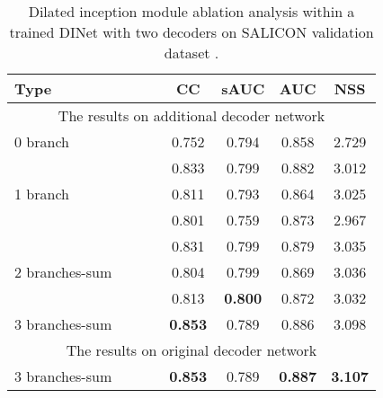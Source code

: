 \begin{table}[]
	\centering
	\scriptsize
	\caption{
Dilated inception module ablation analysis within a trained DINet with two decoders on SALICON validation dataset \cite{jiang2015salicon}.
	}
	\label{table:dimaa1}
	\begin{tabular}{|l|ccc|cccc|}
		\hline
		Type                          & &  & & CC    & sAUC  & AUC   & NSS   \\ \hline \hline
		\multicolumn{8}{|c|}{The results on additional decoder network}               \\ \hline
		0 branch                 &    &    &    &  0.752  & 0.794 & 0.858 & 2.729 \\ \hline
		\multirow{3}{*}{1 branch}     & \checkmark  &    &    & 0.833 & 0.799 & 0.882 & 3.012 \\ \cline{2-8} 
		&    & \checkmark  &    & 0.811  & 0.793 & 0.864 & 3.025 \\ \cline{2-8} 
		&    &    & \checkmark  & 0.801 & 0.759  & 0.873 & 2.967  \\ \hline
		\multirow{3}{*}{2 branches-sum} & \checkmark  & \checkmark  &    & 0.831 & 0.799 & 0.879  & 3.035 \\ \cline{2-8} 
		& \checkmark  &    & \checkmark  & 0.804 &0.799 & 0.869 & 3.036 \\ \cline{2-8} 
		&    & \checkmark  & \checkmark  & 0.813 &\textbf{0.800} & 0.872 & 3.032 \\ \hline
		3 branches-sum                 & \checkmark  & \checkmark  & \checkmark  & \textbf{0.853} & 0.789 & 0.886 & 3.098 \\ \hline \hline
		\multicolumn{8}{|c|}{The results on original decoder network}               \\ \hline
		3 branches-sum                 & \checkmark  & \checkmark  & \checkmark  & \textbf{0.853} & 0.789 & \textbf{0.887} & \textbf{3.107} \\ \hline		
	\end{tabular}
\vspace{-4mm}
\end{table}

